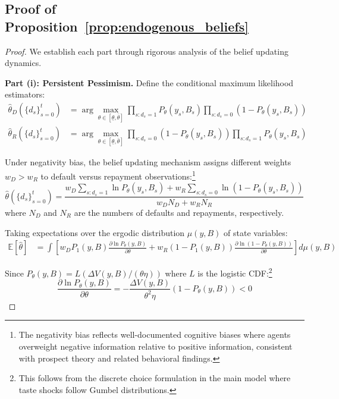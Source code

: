 \documentclass[12pt]{article}
\theoremstyle{plain}
\begin{document}
\subsection{Proof of Proposition~\ref{prop:endogenous_beliefs}}\label{app:proof_endogenous_beliefs}

\begin{proof}
	We establish each part through rigorous analysis of the belief updating dynamics.

	\textbf{Part (i): Persistent Pessimism.}
	Define the conditional maximum likelihood estimators:
	\begin{align}
		\hat{\theta}_D(\{d_s\}_{s=0}^t) & = \arg\max_{\theta \in [\underline{\theta}, \bar{\theta}]} \prod_{s: d_s=1} P_\theta(y_s, B_s) \prod_{s: d_s=0} (1-P_\theta(y_s, B_s)) \label{eq:mle_default} \\
		\hat{\theta}_R(\{d_s\}_{s=0}^t) & = \arg\max_{\theta \in [\underline{\theta}, \bar{\theta}]} \prod_{s: d_s=0} (1-P_\theta(y_s, B_s)) \prod_{s: d_s=1} P_\theta(y_s, B_s) \label{eq:mle_repay}
	\end{align}

	Under negativity bias, the belief updating mechanism assigns different weights
	$w_D > w_R$ to default versus repayment observations:\footnote{The negativity
		bias reflects well-documented cognitive biases where agents overweight negative
		information relative to positive information, consistent with prospect theory
		and related behavioral findings.}
	\begin{equation}
		\hat{\theta}(\{d_s\}_{s=0}^t) = \frac{w_D \sum_{s: d_s=1} \ln P_\theta(y_s, B_s) + w_R \sum_{s: d_s=0} \ln(1-P_\theta(y_s, B_s))}{w_D N_D + w_R N_R} \label{eq:weighted_mle}
	\end{equation}
	where $N_D$ and $N_R$ are the numbers of defaults and repayments, respectively.

	Taking expectations over the ergodic distribution $\mu(y,B)$ of state
	variables:
	\begin{align}
		\mathbb{E}[\hat{\theta}] & = \int \left[ w_D P_1(y,B) \frac{\partial \ln P_\theta(y,B)}{\partial \theta} + w_R (1-P_1(y,B)) \frac{\partial \ln(1-P_\theta(y,B))}{\partial \theta} \right] d\mu(y,B) \label{eq:expected_theta_hat}
	\end{align}

	Since $P_\theta(y,B) = L(\Delta V(y,B)/(\theta\eta))$ where $L$ is the logistic
	CDF:\footnote{This follows from the discrete choice formulation in the main
		model where taste shocks follow Gumbel distributions.}
	\begin{equation}
		\frac{\partial \ln P_\theta(y,B)}{\partial \theta} = -\frac{\Delta V(y,B)}{\theta^2\eta} (1-P_\theta(y,B)) < 0 \label{eq:derivative_log_prob}
	\end{equation}


\end{proof}
\end{document}
